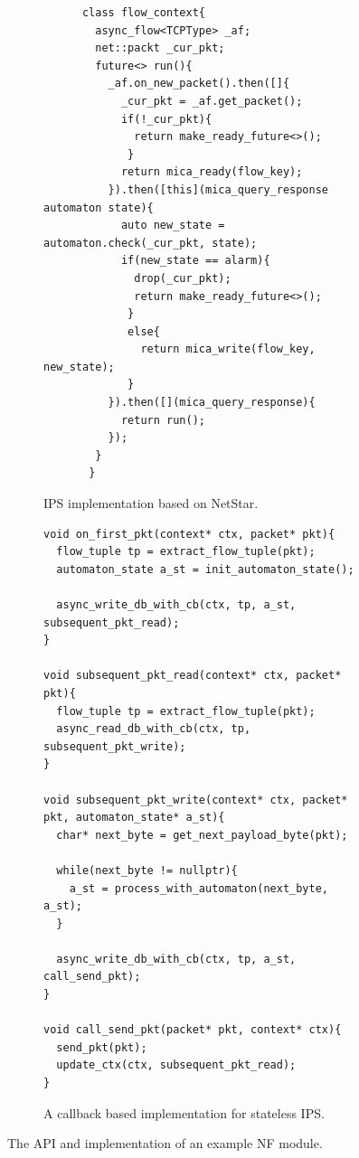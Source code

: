 \begin{figure}[!t]
	\begin{subfigure}[b]{\columnwidth}
		\centering
 	 	\lstset{language=C, numbers=left, showspaces=false,
    		showstringspaces=false, tabsize=2, breaklines=true,
    		xleftmargin=5.0ex, basicstyle=\scriptsize,
		}

		\begin{lstlisting}
      class flow_context{
        async_flow<TCPType> _af;
        net::packt _cur_pkt;
        future<> run(){
          _af.on_new_packet().then([]{
            _cur_pkt = _af.get_packet();
            if(!_cur_pkt){
              return make_ready_future<>();
             }
            return mica_ready(flow_key);
          }).then([this](mica_query_response automaton state){
            auto new_state = automaton.check(_cur_pkt, state);
            if(new_state == alarm){
              drop(_cur_pkt);
              return make_ready_future<>();
             }
             else{
               return mica_write(flow_key, new_state);
             }
          }).then([](mica_query_response){
            return run();
          });
        }
       }
		\end{lstlisting}
		\caption{IPS implementation based on NetStar.}
		\label{fig:api}
    \end{subfigure}\hfill
	\begin{subfigure}[b]{\columnwidth}
		\centering
 	 	\lstset{language=C++, numbers=left, showspaces=false,
    		showstringspaces=false, tabsize=2, breaklines=true,
    		xleftmargin=5.0ex, basicstyle=\scriptsize,
		}

		\begin{lstlisting}
void on_first_pkt(context* ctx, packet* pkt){
  flow_tuple tp = extract_flow_tuple(pkt);
  automaton_state a_st = init_automaton_state();

  async_write_db_with_cb(ctx, tp, a_st, subsequent_pkt_read);
}

void subsequent_pkt_read(context* ctx, packet* pkt){
  flow_tuple tp = extract_flow_tuple(pkt);
  async_read_db_with_cb(ctx, tp, subsequent_pkt_write);
}

void subsequent_pkt_write(context* ctx, packet* pkt, automaton_state* a_st){
  char* next_byte = get_next_payload_byte(pkt);

  while(next_byte != nullptr){
    a_st = process_with_automaton(next_byte, a_st);
  }

  async_write_db_with_cb(ctx, tp, a_st, call_send_pkt);
}

void call_send_pkt(packet* pkt, context* ctx){
  send_pkt(pkt);
  update_ctx(ctx, subsequent_pkt_read);
}
		\end{lstlisting}
		\caption{A callback based implementation for stateless IPS.}\label{fig:example}
	\end{subfigure}
\caption{The API and implementation of an example NF module.}
\label{fig:base-class}
\end{figure}

